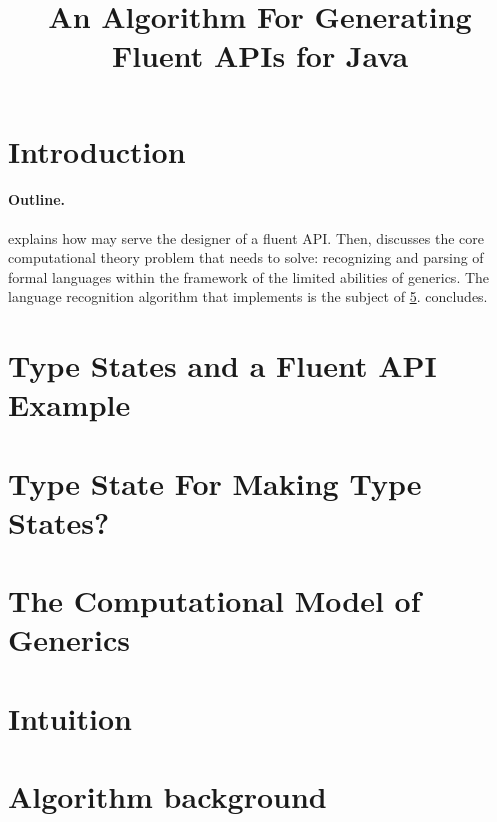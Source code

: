 \documentclass[nonatbib,preprint,numbers]{sigplanconf}
\title
{%
  An Algorithm For Generating Fluent APIs for  Java 
}
\begin{document}
\maketitle

\begin{abstract}
  
\end{abstract}

\section{Introduction}


\paragraph{Outline.}  explains how \Fajita may serve the
designer of a fluent API\@.
Then,  discusses the core computational theory problem
that \Fajita needs to solve: recognizing and parsing of formal languages within
the framework of the limited abilities of \Java generics.  The language
recognition algorithm that \Fajita implements is the subject of
\cref{section:intuition}.   concludes.

\section{Type States and a Fluent API Example}
\label{section:example}


\section{Type State For Making Type States?}
\label{section:generalization}


\section{The Computational Model of \protect\Java Generics}
\label{section:background}


\section{Intuition}
\label{section:intuition}


\section{Algorithm background}
\label{section:algorithm}

\end{document}
